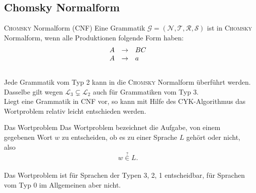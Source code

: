 \documentclass[]{beamer}
\begin{document}
\subsection{Chomsky Normalform}
\begin{frame}[squeeze]{}
  \vspace*{-0.25em}
  \begin{block}{\textsc{Chomsky} Normalform (CNF)}
    Eine Grammatik $\mathcal{G} = \left( \mathcal{N}, \mathcal{T}, \mathcal{R}, \mathcal{S} \right)$ ist in \textsc{Chomsky} Normalform, wenn alle Produktionen folgende Form haben:
    \vspace*{-0.5em}
    \[\begin{array}{l c l}
        A & \rightarrow & BC \\
        A & \rightarrow & a \\
      \end{array}\] \\
    \vspace*{-0.5em}
    Jede Grammatik vom Typ 2 kann in die \textsc{Chomsky} Normalform überführt werden. Dasselbe gilt wegen $\mathcal{L}_3 \subsetneq \mathcal{L}_2$ auch für Grammatiken vom Typ 3. \\
    \vspace*{0.5em}
    Liegt eine Grammatik in CNF vor, so kann mit Hilfe des CYK-Algorithmus das Wortproblem relativ leicht entschieden werden.
  \end{block}
  
  \pause
  \vspace*{-0.5em}
  
  \begin{block}{Das Wortproblem}
    Das Wortproblem bezeichnet die Aufgabe, von einem gegebenen Wort $w$ zu entscheiden, ob es zu einer Sprache $L$ gehört oder nicht, also
    \vspace*{-0.5em}
    \[w \overset{?}{\in} L.\] \\
    \vspace*{-0.5em}
    Das Wortproblem ist für Sprachen der Typen 3, 2, 1 entscheidbar, für Sprachen vom Typ 0 im Allgemeinen aber nicht.
  \end{block}
\end{frame}
\end{document}
